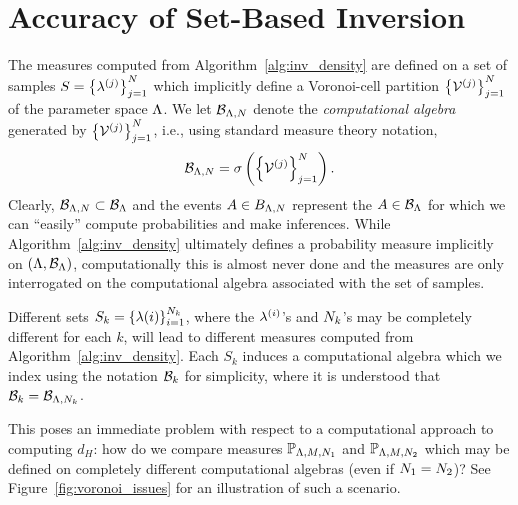 \section{Accuracy of Set-Based Inversion}\label{sec:ch03-set}




The measures computed from Algorithm~\ref{alg:inv_density} are defined on a set of samples $S = \left\{\lambda^{(j)}\right\}_{j=1}^{N}$ which implicitly define a Voronoi-cell partition $\left\{\mathcal{V}^{(j)}\right\}_{j=1}^{N}$ of the parameter space ${\Lambda}$.
We let $\mathcal{B}_{{\Lambda}, N}$ denote the \emph{computational algebra} generated by $\left\{\mathcal{V}^{(j)}\right\}_{j=1}^{N}$, i.e., using standard measure theory notation,
$$
	\mathcal{B}_{{\Lambda},N} = \sigma\left(\left\{\mathcal{V}^{(j)}\right\}_{j=1}^{N}\right).
$$
Clearly, $\mathcal{B}_{{\Lambda}, N}\subset \mathcal{B}_{\Lambda}$ and the events $A\in B_{{\Lambda}, N}$ represent the $A\in\mathcal{B}_{\Lambda}$ for which we can ``easily'' compute probabilities and make inferences.
While Algorithm~\ref{alg:inv_density} ultimately defines a probability measure implicitly on $({\Lambda},\mathcal{B}_{\Lambda})$, computationally this is almost never done and the measures are only interrogated on the computational algebra associated with the set of samples.

Different sets $S_k = \left\{\lambda{(i)}\right\}_{i=1}^{N_k}$, where the $\lambda^{(i)}$'s and $N_k$'s may be completely different for each $k$, will lead to different measures computed from Algorithm~\ref{alg:inv_density}.
Each $S_k$ induces a computational algebra which we index using the notation $\mathcal{B}_{k}$ for simplicity, where it is understood that $\mathcal{B}_k = \mathcal{B}_{{\Lambda}, N_k}$.

This poses an immediate problem with respect to a computational approach to computing $d_H$: how do we compare measures $\mathbb{P}_{{\Lambda}, M, N_1}$ and $\mathbb{P}_{{\Lambda}, M, N_2}$ which may be defined on completely different computational algebras (even if $N_1=N_2$)?
See Figure~\ref{fig:voronoi_issues} for an illustration of such a scenario.


